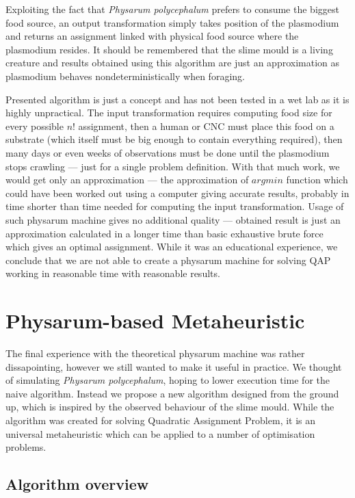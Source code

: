 \documentclass[english,a4paper,twoside]{ppfcmthesis}
\begin{document}
Exploiting the fact that \textit{Physarum polycephalum} prefers to consume the biggest food source, an output transformation simply takes position of the plasmodium and returns an assignment linked with physical food source where the plasmodium resides. It should be remembered that the slime mould is a living creature and results obtained using this algorithm are just an approximation as plasmodium behaves nondeterministically when foraging.

Presented algorithm is just a concept and has not been tested in a wet lab as it is highly unpractical. The input transformation requires computing food size for every possible $n!$ assignment, then a human or CNC must place this food on a substrate (which itself must be big enough to contain everything required), then many days or even weeks of observations must be done until the plasmodium stops crawling --- just for a single problem definition. With that much work, we would get only an approximation --- the approximation of $argmin$ function which could have been worked out using a computer giving accurate results, probably in time shorter than time needed for computing the input transformation. Usage of such physarum machine gives no additional quality --- obtained result is just an approximation calculated in a longer time than basic exhaustive brute force which gives an optimal assignment. While it was an educational experience, we conclude that we are not able to create a physarum machine for solving QAP working in reasonable time with reasonable results.

\section{Physarum-based Metaheuristic}
\label{section:algorithm_metaheuristic}

The final experience with the theoretical physarum machine was rather dissapointing, however we still wanted to make it useful in practice. We thought of simulating \textit{Physarum polycephalum}, hoping to lower execution time for the naive algorithm. Instead we propose a new algorithm designed from the ground up, which is inspired by the observed behaviour of the slime mould. While the algorithm was created for solving Quadratic Assignment Problem, it is an universal metaheuristic which can be applied to a number of optimisation problems.


\subsection{Algorithm overview}
\end{document}
